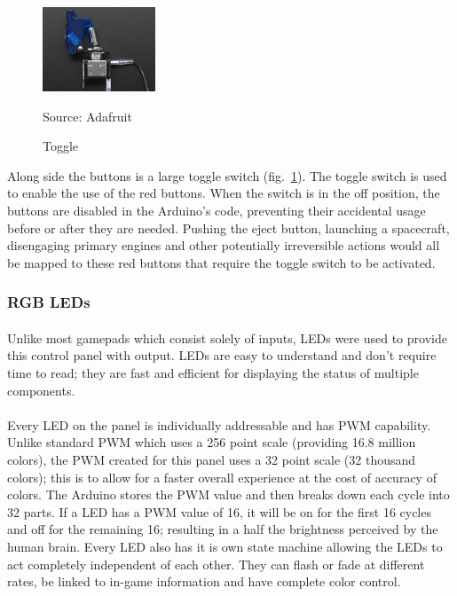 \documentclass[12pt,a4paper]{article}
\newcommand{\source}[1]{\vspace{-0.6cm}\caption*{Source: {#1}} }
\begin{document}
\paragraph{}
\begin{figure}
	\vspace{-0.2cm}
	\centering
	\includegraphics[width=0.3\textwidth]{toggle}
	\caption{Toggle}
	\source{Adafruit}
	\label{fig:toggle}
\end{figure}
Along side the buttons is a large toggle switch (fig.~\ref{fig:toggle}). The toggle switch is used to enable the use of the red buttons. When the switch is in the off position, the buttons are disabled in the Arduino's code, preventing their accidental usage before or after they are needed. Pushing the eject button, launching a spacecraft, disengaging primary engines and other potentially irreversible actions would all be mapped to these red buttons that require the toggle switch to be activated.

\subsubsection{RGB LEDs}
\paragraph{}
Unlike most gamepads which consist solely of inputs, \glspl{LED} were used to provide this control panel with output. \glspl{LED} are easy to understand and don't require time to read; they are fast and efficient for displaying the status of multiple components.
\paragraph{}
Every \gls{LED} on the panel is individually addressable and has \gls{PWM} capability.  Unlike standard \gls{PWM} which uses a 256 point scale (providing 16.8 million colors), the \gls{PWM} created for this panel uses a 32 point scale (32 thousand colors); this is to allow for a faster overall experience at the cost of accuracy of colors. The Arduino stores the \gls{PWM} value and then breaks down each cycle into 32 parts. If a \gls{LED} has a \gls{PWM} value of 16, it will be on for the first 16 cycles and off for the remaining 16; resulting in a half the brightness perceived by the human brain. Every \gls{LED} also has it is own state machine allowing the \glspl{LED} to act completely independent of each other. They can flash or fade at different rates, be linked to in-game information and have complete color control.
\end{document}
